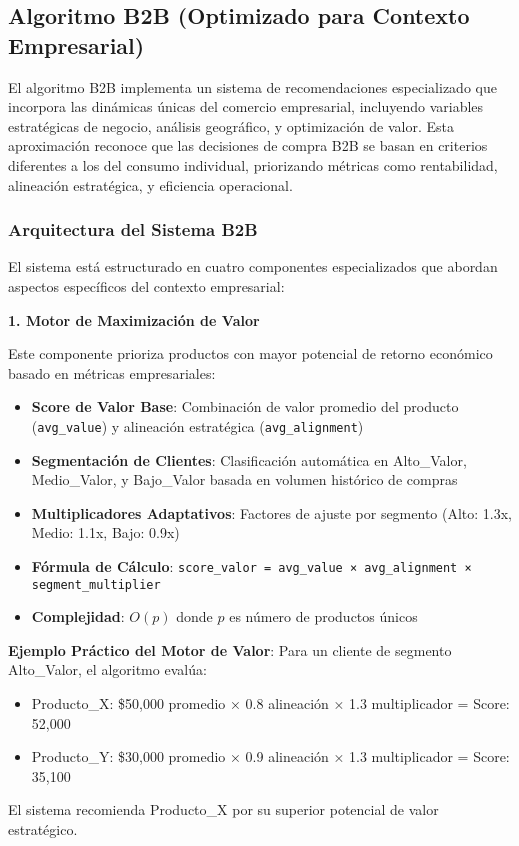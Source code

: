 \documentclass[twocolumn]{article}
\begin{document}
\subsection{Algoritmo B2B (Optimizado para Contexto Empresarial)}

El algoritmo B2B implementa un sistema de recomendaciones especializado que incorpora las dinámicas únicas del comercio empresarial, incluyendo variables estratégicas de negocio, análisis geográfico, y optimización de valor. Esta aproximación reconoce que las decisiones de compra B2B se basan en criterios diferentes a los del consumo individual, priorizando métricas como rentabilidad, alineación estratégica, y eficiencia operacional.

\subsubsection{Arquitectura del Sistema B2B}

El sistema está estructurado en cuatro componentes especializados que abordan aspectos específicos del contexto empresarial:

\textbf{1. Motor de Maximización de Valor}

Este componente prioriza productos con mayor potencial de retorno económico basado en métricas empresariales:

\begin{itemize}
    \item \textbf{Score de Valor Base}: Combinación de valor promedio del producto (\texttt{avg\_value}) y alineación estratégica (\texttt{avg\_alignment})
    \item \textbf{Segmentación de Clientes}: Clasificación automática en Alto\_Valor, Medio\_Valor, y Bajo\_Valor basada en volumen histórico de compras
    \item \textbf{Multiplicadores Adaptativos}: Factores de ajuste por segmento (Alto: 1.3x, Medio: 1.1x, Bajo: 0.9x)
    \item \textbf{Fórmula de Cálculo}: \texttt{score\_valor = avg\_value × avg\_alignment × segment\_multiplier}
    \item \textbf{Complejidad}: \(O(p)\) donde \(p\) es número de productos únicos
\end{itemize}

\textbf{Ejemplo Práctico del Motor de Valor}:
Para un cliente de segmento Alto\_Valor, el algoritmo evalúa:
\begin{itemize}
    \item Producto\_X: \$50,000 promedio × 0.8 alineación × 1.3 multiplicador = Score: 52,000
    \item Producto\_Y: \$30,000 promedio × 0.9 alineación × 1.3 multiplicador = Score: 35,100
\end{itemize}
El sistema recomienda Producto\_X por su superior potencial de valor estratégico.
\end{document}
